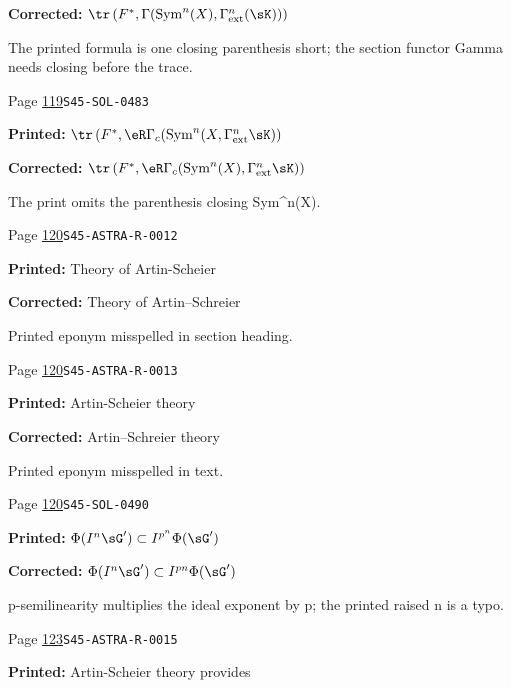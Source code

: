 \begin{description}
\par\noindent\textbf{Corrected:} \(\tr\left(F^*,\Gamma(\operatorname{Sym}^n(X),\Gamma_\text{ext}^n(\sK))\right)\)
\par\noindent The printed formula is one closing parenthesis short; the section functor Gamma needs closing before the trace.
\smallskip
\item[\hypertarget{apparatus:EN-0052}{52}] Page \hyperlink{printpage:en:119}{119}\quad\texttt{S45-SOL-0483}
\par\noindent\textbf{Printed:} \(\tr\left(F^*,\eR\Gamma_c(\operatorname{Sym}^n(X,\Gamma_\text{ext}^n \sK)\right)\)
\par\noindent\textbf{Corrected:} \(\tr\left(F^*,\eR\Gamma_c(\operatorname{Sym}^n(X),\Gamma_\text{ext}^n \sK)\right)\)
\par\noindent The print omits the parenthesis closing Sym\textasciicircum{}n(X).
\smallskip
\item[\hypertarget{apparatus:EN-0053}{53}] Page \hyperlink{printpage:en:120}{120}\quad\texttt{S45-ASTRA-R-0012}
\par\noindent\textbf{Printed:} Theory of Artin-Scheier
\par\noindent\textbf{Corrected:} Theory of Artin--Schreier
\par\noindent Printed eponym misspelled in section heading.
\smallskip
\item[\hypertarget{apparatus:EN-0054}{54}] Page \hyperlink{printpage:en:120}{120}\quad\texttt{S45-ASTRA-R-0013}
\par\noindent\textbf{Printed:} Artin-Scheier theory 
\par\noindent\textbf{Corrected:} Artin--Schreier theory 
\par\noindent Printed eponym misspelled in text.
\smallskip
\item[\hypertarget{apparatus:EN-0055}{55}] Page \hyperlink{printpage:en:120}{120}\quad\texttt{S45-SOL-0490}
\par\noindent\textbf{Printed:} \(\Phi(I^n \sG')\subset I^{p^n}\Phi(\sG')\)
\par\noindent\textbf{Corrected:} \(\Phi(I^n \sG')\subset I^{p n}\Phi(\sG')\)
\par\noindent p-semilinearity multiplies the ideal exponent by p; the printed raised n is a typo.
\smallskip
\item[\hypertarget{apparatus:EN-0056}{56}] Page \hyperlink{printpage:en:123}{123}\quad\texttt{S45-ASTRA-R-0015}
\par\noindent\textbf{Printed:} Artin-Scheier theory provides

\end{description}
